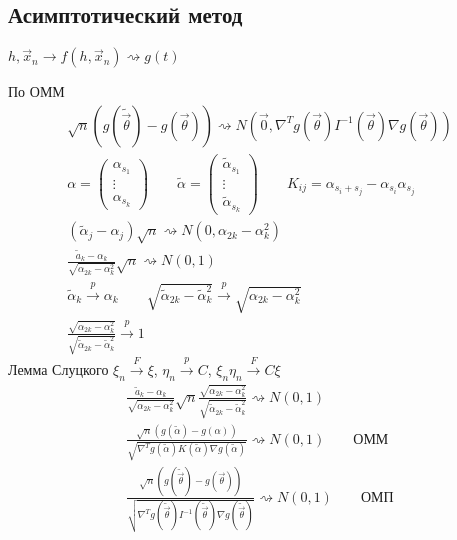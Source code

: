 \documentclass{article}
\begin{document}
\subsection{Асимптотический метод}
$h, \vec{x}_n \rightarrow f(h,\vec{x}_n) \rightsquigarrow g(t)$

По ОММ
  \begin{gather*}
    \sqrt{n}(g(\tilde{\vec{\theta}})-g(\vec{\theta})) \rightsquigarrow N(\vec{0}, \nabla ^{T} g(\vec{\theta})I^{-1}(\vec{\theta})\nabla g(\vec{\theta})) \\ 
    \alpha=\begin{pmatrix}
      \alpha_{s_1} \\ \vdots \\ \alpha_{s_k}
    \end{pmatrix}
    \qquad 
    \tilde\alpha=\begin{pmatrix}
      \tilde{\alpha}_{s_1} \\ \vdots \\ \tilde{\alpha}_{s_k}
    \end{pmatrix} \qquad K_{ij}=\alpha_{s_i+s_j}-\alpha_{s_i}\alpha_{s_j} \\ 
    (\tilde{\alpha}_j-\alpha_j)\sqrt{n} \rightsquigarrow N(0, \alpha_{2k}-\alpha_k^{2}) \\ 
    \frac{\tilde{a}_k-\alpha_k}{\sqrt{\alpha_{2k}-\alpha_k^{2}}}\sqrt{n} \rightsquigarrow N(0,1) \\ 
    \tilde{\alpha}_k \overset{p}{\to} \alpha_k \qquad \sqrt{\tilde{\alpha}_{2k}-\tilde{\alpha}_k^{2}} \overset{p}{\to} \sqrt{\alpha_{2k}-\alpha_k^{2}} \\ 
    \frac{\sqrt{\alpha_{2k}-\alpha_k^{2}}}{\sqrt{\tilde{\alpha}_{2k}-\tilde{\alpha}_k^{2}} } \overset{ p}{ \to} 1
  \end{gather*}
  Лемма Слуцкого $\xi_n \overset{F}{\to} \xi$, $\eta_n \overset{p}{\to} C$, $\xi_n\eta_n \overset{F}{\to} C\xi$
  \begin{gather*}
    \frac{\tilde{a}_k-\alpha_k}{\sqrt{\alpha_{2k}-\alpha_k^{2}}}\sqrt{n}\frac{\sqrt{\alpha_{2k}-\alpha_k^{2}}}{\sqrt{\tilde{\alpha}_{2k}-\tilde{\alpha}_k^{2}} } \rightsquigarrow N(0,1) \\ 
    \boxed{
      \frac{\sqrt{n}(g(\tilde{\alpha})-g(\alpha))}{\sqrt{\nabla ^{T} g(\tilde{\alpha})K(\tilde{\alpha})\nabla g(\tilde{\alpha})}} \rightsquigarrow N(0,1)
    \qquad \text{ОММ} }\\ 
    \boxed{
      \frac{\sqrt{n}(g(\tilde{\vec{\theta}})-g(\vec{\theta}))}{\sqrt{\nabla ^{T} g(\tilde{\vec{\theta}})I^{-1}(\tilde{\vec{\theta}})\nabla g(\tilde{\vec{\theta}})}} \rightsquigarrow N(0,1)
    \qquad \text{ОМП} }
  \end{gather*}
\end{document}
